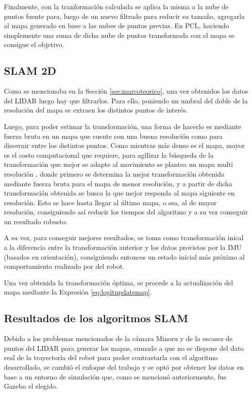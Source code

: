 Finalmente, con la tranformación calculada se aplica la misma a la nube de puntos fuente para, luego de un nuevo filtrado para reducir su tamaño, agregarla al mapa generado en base a las nubes de puntos previas. En PCL, haciendo simplemente una suma de dicha nube de puntos transformada con el mapa se consigue el objetivo.

\subsection{SLAM 2D}
Como se mencionaba en la Sección \ref{sec:marcoteorico}, una vez obtenidos los datos del LIDAR luego hay que filtrarlos. Para ello, poniendo un umbral del doble de la resolución del mapa se extraen los distintos puntos de interés.

Luego, para poder estimar la transformación, una forma de hacerlo es mediante fuerza bruta en un mapa que cuente con una buena resolución como para discernir entre los distintos puntos. Como mientras más denso es el mapa, mayor es el costo computacional que requiere, para agilizar la búsqueda de la transformación que mejor se adapte al movimiento se plantea un mapa multi resolución \cite{olson2015}, donde primero se determina la mejor transformación obtenida mediante fuerza bruta para el mapa de menor resolución, y a partir de dicha transformación obtenida se busca la que mejor responda al mapa siguiente en resolución. Esto se hace hasta llegar al último mapa, o sea, al de mayor resolución, consiguiendo así reducir los tiempos del algoritmo y a su vez conseguir un resultado robusto.

A su vez, para conseguir mejores resultados, se toma como transformación inical a la diferencia entre la transformación anterior y los datos provistos por la IMU (basados en orientación), consiguiendo entonces un estado inicial más próximo al comportamiento realizado por del robot.

Una vez obtenida la transformación óptima, se procede a la actualización del mapa mediante la Expresión \ref{eq:logitupdatemap}.

\subsection{Resultados de los algoritmos SLAM}
Debido a los problemas mencionados de la cámara Minoru y de la escasez de puntos del LIDAR para generar los mapas, sumado a que no se dispone del dato real de la trayectoria del robot para poder contrastarla con el algoritmo desarrollado, se cambió el enfoque del trabajo y se optó por obtener los datos en base a un entorno de simulación que, como se mencionó anteriormente, fue Gazebo el elegido. 

